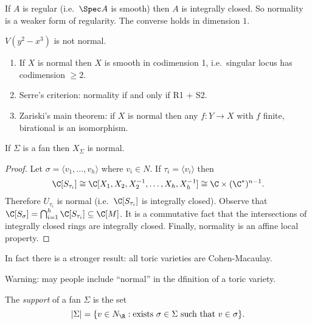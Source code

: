 \documentclass[a4paper]{article}
\begin{document}
\begin{remark}
  If \(A\) is regular (i.e.\ \(\Spec A\) is smooth) then \(A\) is integrally closed. So normality is a weaker form of regularity. The converse holds in dimension \(1\).
\end{remark}

\begin{ex}
  \(V(y^2 - x^3)\) is not normal.
\end{ex}

\begin{remark}\leavevmode
  \begin{enumerate}
  \item If \(X\) is normal then \(X\) is smooth in codimension 1, i.e.\ singular locus has codimension \(\geq 2\).
  \item Serre's criterion: normality if and only if R1 + S2.
  \item Zariski's main theorem: if \(X\) is normal then any \(f: Y \to X\) with \(f\) finite, birational is an isomorphism.
  \end{enumerate}
\end{remark}

\begin{lemma}
  If \(\Sigma\) is a fan then \(X_\Sigma\) is normal.
\end{lemma}

\begin{proof}
  Let \(\sigma = \langle v_1, \dots, v_h \rangle\) where \(v_i \in N\). If \(\tau_i = \langle v_i \rangle\) then
  \[
    \C[S_{\tau_i}] \cong \C[X_1, X_2, X_2^{-1}, \dots, X_h, X_h^{-1}] \cong \C \times (\C^*)^{n - 1}.
  \]
  Therefore \(U_{\tau_i}\) is normal (i.e.\ \(\C[S_{\tau_i}]\) is integrally closed). Observe that \(\C[S_\sigma] = \bigcap_{i = 1}^h \C[S_{\tau_i}] \subseteq \C[M]\). It is a commutative fact that the intersections of integrally closed rings are integrally closed. Finally, normality is an affine local property.
\end{proof}

In fact there is a stronger result: all toric varieties are Cohen-Macaulay.

Warning: may people include ``normal'' in the dfinition of a toric variety.

\begin{definition}
  The \emph{support} of a fan \(\Sigma\) is the set
  \[
    |\Sigma| = \{v \in N_\R: \text{exists } \sigma \in \Sigma \text{ such that } v \in \sigma\}.
  \]
\end{definition}
\end{document}
